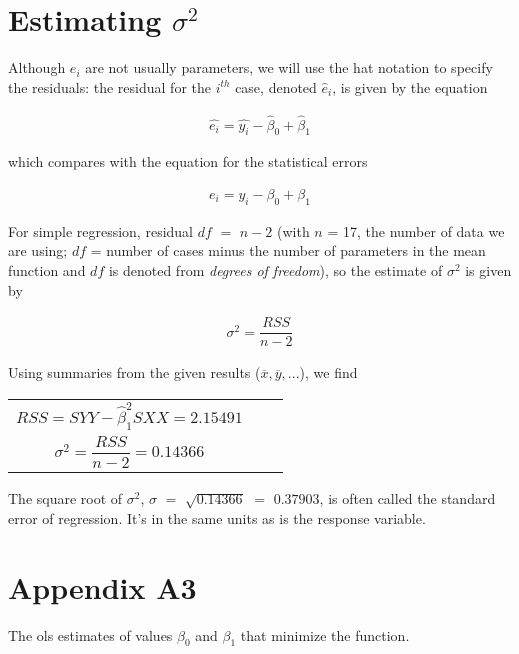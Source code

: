 \documentclass{article}
\begin{document}
\section{Estimating $\sigma ^ {2}$}

    Although ${e}_{i}$ are not usually parameters, we will use the hat notation to specify the residuals: the residual for the $i^{th}$ case, denoted $\hat{e}_{i}$, is given by the equation
    
    \begin{align} 
        \hat{e _{i}} = \hat{y_{i}} - \hat\beta_{0} + \hat\beta_{1} 
    \end{align}
    
    which compares with the equation for the statistical errors
    
    \begin{align} 
        {e _{i}} = {y_{i}} - \beta_{0} + \beta_{1} 
    \end{align}
   
    For simple regression, residual $df$ $=$ $n - 2$ (with $n$ = 17, the number of data we are using; $df$ = number of cases minus the number of parameters in the mean function and $df$ is denoted from \textit{degrees of freedom}), so the estimate of $\sigma ^ 2$ is given by
    
    \begin{align} 
        {\sigma^2} = \dfrac{RSS}{n-2}
    \end{align}
    
    Using summaries from the given results ($\overline{x}, \overline{y}, ...$), we find
        
    \begin{center}
        \begin{tabular}{c c c}
            $RSS = SYY - \hat\beta_{1}^2 SXX = 2.15491$ \\
            $\sigma^2 = \dfrac{RSS}{n - 2} = 0.14366$
        \end{tabular}
    \end{center}
    
    The square root of $\sigma ^ 2$, $\sigma$ $=$ $\sqrt{0.14366}$ $=$ $0.37903$, is often called the standard error of regression. It's in the same units as is the response variable.
    
\section{Appendix A3} 
    The ols estimates of values ${\beta_{0}}$ and ${\beta_{1}}$ that minimize the function.
    
\end{document}
